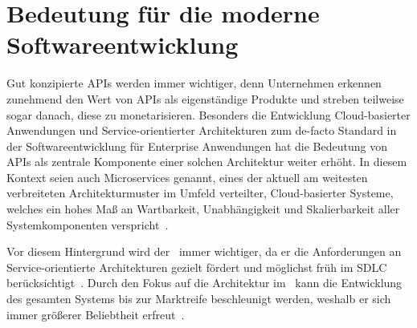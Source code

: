\section{Bedeutung für die moderne Softwareentwicklung}
Gut konzipierte \acp{API} werden immer wichtiger, denn Unternehmen erkennen zunehmend den Wert von \acp{API} als eigenständige Produkte und streben teilweise sogar danach, diese zu monetarisieren.
Besonders die Entwicklung Cloud-basierter Anwendungen und Service-orientierter Architekturen zum de-facto Standard in der Softwareentwicklung für Enterprise Anwendungen hat die Bedeutung von \acp{API} als zentrale Komponente einer solchen Architektur weiter erhöht.
In diesem Kontext seien auch Microservices genannt, eines der aktuell am weitesten verbreiteten Architekturmuster im Umfeld verteilter, Cloud-basierter Systeme, welches ein hohes Maß an Wartbarkeit, Unabhängigkeit und Skalierbarkeit aller Systemkomponenten verspricht~\autocites[73-75]{bea22}[5]{kul23}.

Vor diesem Hintergrund wird der \AFA\ immer wichtiger, da er die Anforderungen an Service-orientierte Architekturen gezielt fördert und möglichst früh im \ac{SDLC} berücksichtigt~\autocite[1627]{cha21}.
Durch den Fokus auf die Architektur im \AFA\ kann die Entwicklung des gesamten Systems bis zur Marktreife beschleunigt werden, weshalb er sich immer größerer Beliebtheit erfreut~\autocite[76]{bea22}.